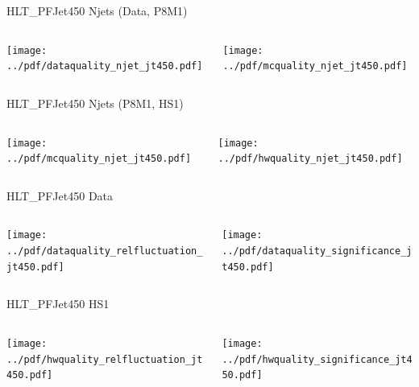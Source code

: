 \documentclass[9pt]{beamer}
\begin{document}
\begin{frame}[t]{HLT\_PFJet450 Njets (Data, P8M1)}
\begin{columns}[T]
  \begin{column}{.5\textwidth}
  \texttt{[image: ../pdf/dataquality\_njet\_jt450.pdf]}
  \end{column}
  \begin{column}{.5\textwidth}
  \texttt{[image: ../pdf/mcquality\_njet\_jt450.pdf]}
  \end{column}
\end{columns}
\end{frame}

\begin{frame}[t]{HLT\_PFJet450 Njets (P8M1, HS1)}
\begin{columns}[T]
  \begin{column}{.5\textwidth}
  \texttt{[image: ../pdf/mcquality\_njet\_jt450.pdf]}
  \end{column}
  \begin{column}{.5\textwidth}
  \texttt{[image: ../pdf/hwquality\_njet\_jt450.pdf]}
  \end{column}
\end{columns}
\end{frame}

\begin{frame}[t]{HLT\_PFJet450 Data}
\begin{columns}[T]
  \begin{column}{.5\textwidth}
  \texttt{[image: ../pdf/dataquality\_relfluctuation\_jt450.pdf]}
  \end{column}
  \begin{column}{.5\textwidth}
  \texttt{[image: ../pdf/dataquality\_significance\_jt450.pdf]}
  \end{column}
\end{columns}
\end{frame}

\begin{frame}[t]{HLT\_PFJet450 HS1}
\begin{columns}[T]
  \begin{column}{.5\textwidth}
  \texttt{[image: ../pdf/hwquality\_relfluctuation\_jt450.pdf]}
  \end{column}
  \begin{column}{.5\textwidth}
  \texttt{[image: ../pdf/hwquality\_significance\_jt450.pdf]}
  \end{column}
\end{columns}
\end{frame}
\end{document}
